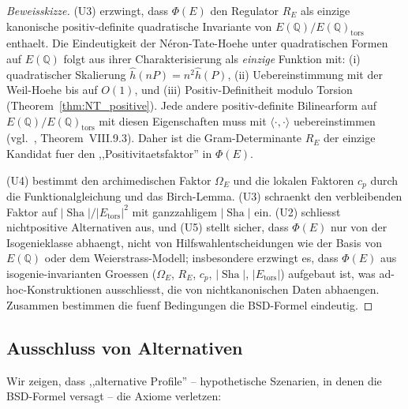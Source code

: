 \documentclass[aps,prd,twocolumn,superscriptaddress,nofootinbib]{revtex4-2}
\theoremstyle{definition}
\theoremstyle{remark}
\DeclareMathOperator{\Sha}{Sha}
\begin{document}
\begin{proof}[Beweisskizze]
(U3) erzwingt, dass $\Phi(E)$ den Regulator $R_E$ als einzige kanonische positiv-definite quadratische Invariante von $E(\mathbb{Q})/E(\mathbb{Q})_{\mathrm{tors}}$ enthaelt. Die Eindeutigkeit der N\'eron-Tate-Hoehe unter quadratischen Formen auf $E(\mathbb{Q})$ folgt aus ihrer Charakterisierung als \textit{einzige} Funktion mit: (i) quadratischer Skalierung $\hat{h}(nP) = n^2 \hat{h}(P)$, (ii) Uebereinstimmung mit der Weil-Hoehe bis auf $O(1)$, und (iii) Positiv-Definitheit modulo Torsion (Theorem~\ref{thm:NT_positive}). Jede andere positiv-definite Bilinearform auf $E(\mathbb{Q})/E(\mathbb{Q})_{\mathrm{tors}}$ mit diesen Eigenschaften muss mit $\langle\cdot,\cdot\rangle$ uebereinstimmen (vgl.\ \cite{Silverman2009}, Theorem~VIII.9.3). Daher ist die Gram-Determinante $R_E$ der einzige Kandidat fuer den ,,Positivitaetsfaktor'' in $\Phi(E)$.

(U4) bestimmt den archimedischen Faktor $\Omega_E$ und die lokalen Faktoren $c_p$ durch die Funktionalgleichung und das Birch-Lemma. (U3) schraenkt den verbleibenden Faktor auf $|\Sha|/|E_{\mathrm{tors}}|^2$ mit ganzzahligem $|\Sha|$ ein. (U2) schliesst nichtpositive Alternativen aus, und (U5) stellt sicher, dass $\Phi(E)$ nur von der Isogenieklasse abhaengt, nicht von Hilfswahlentscheidungen wie der Basis von $E(\mathbb{Q})$ oder dem Weierstrass-Modell; insbesondere erzwingt es, dass $\Phi(E)$ aus isogenie-invarianten Groessen ($\Omega_E$, $R_E$, $c_p$, $|\Sha|$, $|E_{\mathrm{tors}}|$) aufgebaut ist, was ad-hoc-Konstruktionen ausschliesst, die von nichtkanonischen Daten abhaengen. Zusammen bestimmen die fuenf Bedingungen die BSD-Formel eindeutig.
\end{proof}

\subsection{Ausschluss von Alternativen}

Wir zeigen, dass ,,alternative Profile'' -- hypothetische Szenarien, in denen die BSD-Formel versagt -- die Axiome verletzen:
\end{document}
